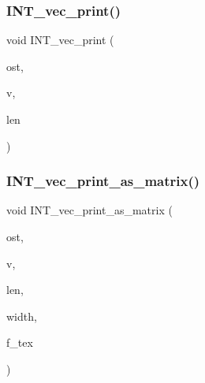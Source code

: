 \mbox{\label{util_8_c_a79a5901af0b47dd0d694109543c027fe}} 
\subsubsection{\texorpdfstring{I\+N\+T\+\_\+vec\+\_\+print()}{INT\_vec\_print()}}
{\footnotesize\ttfamily void I\+N\+T\+\_\+vec\+\_\+print (\begin{DoxyParamCaption}\item[{ostream \&}]{ost,  }\item[{\mbox{\hyperlink{galois_8h_a09fddde158a3a20bd2dcadb609de11dc}{I\+NT}} $\ast$}]{v,  }\item[{\mbox{\hyperlink{galois_8h_a09fddde158a3a20bd2dcadb609de11dc}{I\+NT}}}]{len }\end{DoxyParamCaption})}

\mbox{\label{util_8_c_a72155bb8a3aef3942bf2cd40bf5f10a5}} 
\subsubsection{\texorpdfstring{I\+N\+T\+\_\+vec\+\_\+print\+\_\+as\+\_\+matrix()}{INT\_vec\_print\_as\_matrix()}}
{\footnotesize\ttfamily void I\+N\+T\+\_\+vec\+\_\+print\+\_\+as\+\_\+matrix (\begin{DoxyParamCaption}\item[{ostream \&}]{ost,  }\item[{\mbox{\hyperlink{galois_8h_a09fddde158a3a20bd2dcadb609de11dc}{I\+NT}} $\ast$}]{v,  }\item[{\mbox{\hyperlink{galois_8h_a09fddde158a3a20bd2dcadb609de11dc}{I\+NT}}}]{len,  }\item[{\mbox{\hyperlink{galois_8h_a09fddde158a3a20bd2dcadb609de11dc}{I\+NT}}}]{width,  }\item[{\mbox{\hyperlink{galois_8h_a09fddde158a3a20bd2dcadb609de11dc}{I\+NT}}}]{f\+\_\+tex }\end{DoxyParamCaption})}

\mbox{\label{util_8_c_a2fa979d22386f64bd3823dded0177c3f}} 
